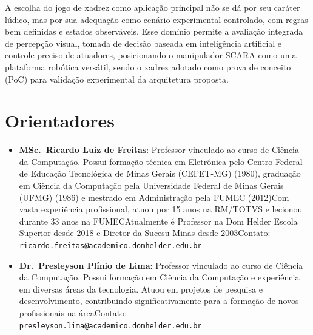 A escolha do jogo de xadrez como aplicação principal não se dá por seu caráter lúdico, mas por sua adequação como cenário experimental controlado, com regras bem definidas e estados observáveis. Esse domínio permite a avaliação integrada de percepção visual, tomada de decisão baseada em inteligência artificial e controle preciso de atuadores, posicionando o manipulador SCARA como uma plataforma robótica versátil, sendo o xadrez adotado como prova de conceito (PoC) para validação experimental da arquitetura proposta.

\section*{Orientadores}

\begin{itemize}
    \item \textbf{MSc.\ Ricardo Luiz de Freitas}:
Professor vinculado ao curso de Ciência da Computação\@. Possui formação técnica em Eletrônica pelo Centro Federal de Educação Tecnológica de Minas Gerais (CEFET-MG) (1980), graduação em Ciência da Computação pela Universidade Federal de Minas Gerais (UFMG) (1986) e mestrado em Administração pela FUMEC (2012)\@ Com vasta experiência profissional, atuou por 15 anos na RM/TOTVS e lecionou durante 33 anos na FUMEC\@ Atualmente é Professor na Dom Helder Escola Superior desde 2018 e Diretor da Sucesu Minas desde 2003\@ Contato: \texttt{ricardo.freitas@academico.domhelder.edu.br}

    \item \textbf{Dr.\ Presleyson Plínio de Lima}:
Professor vinculado ao curso de Ciência da Computação\@. Possui formação em Ciência da Computação e experiência em diversas áreas da tecnologia. Atuou em projetos de pesquisa e desenvolvimento, contribuindo significativamente para a formação de novos profissionais na área\@ Contato: \texttt{presleyson.lima@academico.domhelder.edu.br}
    
\end{itemize}